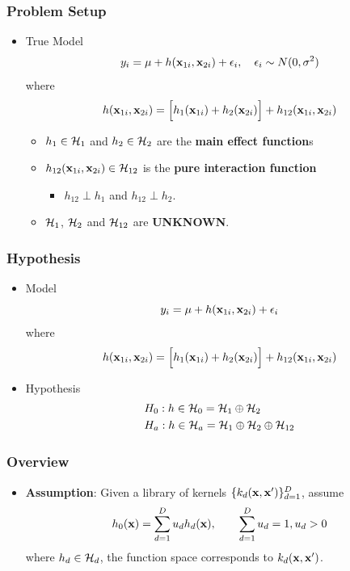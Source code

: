 \documentclass{beamer}
\begin{document}
\begin{frame}
\frametitle{Problem Setup}
\begin{itemize}[<+->]
\item True Model
$$y_i = \mu + h({\bf x}_{1i}, {\bf x}_{2i}) + \epsilon_i, \quad \epsilon_i \sim N(0, \sigma^2)$$
where
$$h({\bf x}_{1i}, {\bf x}_{2i}) = \Big[ 
h_1({\bf x}_{1i}) + h_2({\bf x}_{2i})  \Big] + h_{12}({\bf x}_{1i}, {\bf x}_{2i})$$
\begin{itemize}
\item $h_{1} \in {\cal H}_1$ and $h_2 \in {\cal H}_2$ are the \textbf{main effect function}s
\item $h_{12}({\bf x}_{1i}, {\bf x}_{2i}) \in {\cal H}_{12}$ is the \textbf{pure interaction function}
\begin{itemize}
\item $h_{12} \perp h_1$ and  $h_{12} \perp h_2$.
\end{itemize}
\item ${\cal H}_1$, ${\cal H}_2$ and ${\cal H}_{12}$ are \textbf{UNKNOWN}.
\end{itemize}
\end{itemize}
\end{frame}

\begin{frame}

\frametitle{Hypothesis}
\begin{itemize}
\item Model 
$$y_i = \mu + h({\bf x}_{1i}, {\bf x}_{2i}) + \epsilon_i$$
where
$$h({\bf x}_{1i}, {\bf x}_{2i}) = \Big[ 
h_1({\bf x}_{1i}) + h_2({\bf x}_{2i})  \Big] + h_{12}({\bf x}_{1i}, {\bf x}_{2i})$$
\item Hypothesis 
\begin{align*}
&H_0: h \in {\cal H}_0 = {\cal H}_1 \oplus {\cal H}_2 \\
&H_a: h \in {\cal H}_a = {\cal H}_1 \oplus {\cal H}_2 \oplus {\cal H}_{12}
\end{align*}
\end{itemize}
\end{frame}


\begin{frame}
\frametitle{Overview}
\begin{itemize}
\item \textbf{Assumption}:
Given a library of kernels $\{k_d({\bf x}, {\bf x}')\}_{d=1}^D$, assume 
$$h_0({\bf x}) = \sum_{d=1}^D u_d h_d({\bf x}), \qquad \sum_{d=1}^D u_d = 1, u_d > 0$$
where $h_d \in {\cal H}_d$, the function space corresponds to $k_d({\bf x}, {\bf x}')$.

\end{itemize}
\end{frame}
\end{document}

